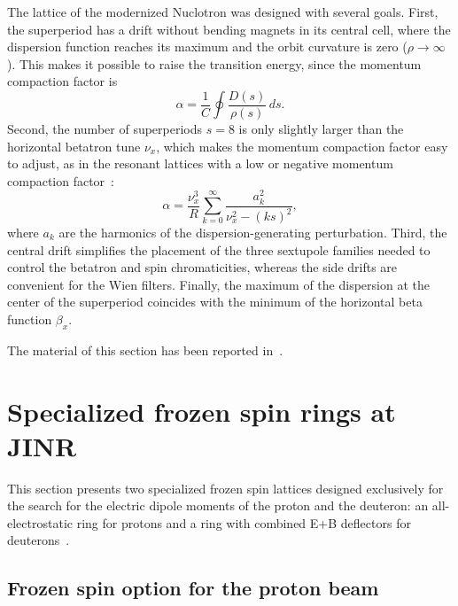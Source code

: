 \documentclass[%
  aps,
  pra,
  preprint,
  a4paper,
  amsmath,
  amssymb,
  floatfix,
  longbibliography,
  superscriptaddress
]{revtex4-2}
\begin{document}
The lattice of the modernized Nuclotron was designed with several goals.
First, the superperiod has a drift without bending magnets in its central
cell, where the dispersion function reaches its maximum and the orbit
curvature is zero ($\rho\to\infty$). This makes it possible to raise the
transition energy, since the momentum compaction factor is
\begin{equation}
  \alpha = \frac{1}{C}\oint\frac{D(s)}{\rho(s)}\,ds .
\end{equation}
Second, the number of superperiods $s = 8$ is only slightly larger than the
horizontal betatron tune $\nu_x$, which makes the momentum compaction factor
easy to adjust, as in the resonant lattices with a low or negative momentum
compaction factor~\cite{Senichev:1997kn,Ishi:1998tj,Papaphilippou:2010zz,Senichev:2008zza,Toelle:2007zz}:
\begin{equation}
  \alpha = \frac{\nu_x^3}{R}\sum_{k=0}^{\infty}\frac{a_k^2}{\nu_x^2-(ks)^2},
\end{equation}
where $a_k$ are the harmonics of the dispersion-generating perturbation.
Third, the central drift simplifies the placement of the three sextupole
families needed to control the betatron and spin chromaticities, whereas the
side drifts are convenient for the Wien filters. Finally, the maximum of the
dispersion at the center of the superperiod coincides with the minimum of the
horizontal beta function $\beta_x$.

The material of this section has been reported
in~\cite{Senichev:2023vtx,Senichev:2024vhw,Senichev:2024fey,Senichev:2025ude,Senichev:2026xca,Kolokolchikov:2025sew,Senichev:2025jqf}.

\section{Specialized frozen spin rings at JINR}
\label{sec:specialized-ring}

This section presents two specialized frozen spin lattices designed
exclusively for the search for the electric dipole moments of the proton and
the deuteron: an all-electrostatic ring for protons and a ring with combined
E+B deflectors for deuterons~\cite{Palamarchuka:2026pyv}.

\subsection{Frozen spin option for the proton beam}
\end{document}
